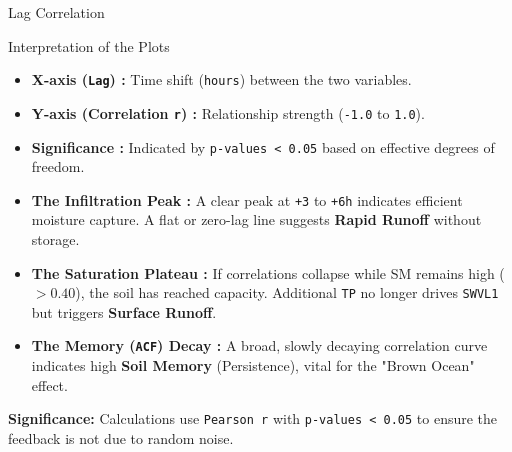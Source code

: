 \documentclass[8pt, aspectratio=169]{beamer}
\begin{document}
\begin{frame}{Lag Correlation}
    \vspace{0.2cm}
    \begin{block}{Interpretation of the Plots}
        \begin{itemize}
            \item \textbf{X-axis (\texttt{Lag}) :} Time shift (\texttt{hours}) between the two variables.
            \item \textbf{Y-axis (Correlation \texttt{r}) :} Relationship strength (\texttt{-1.0} to \texttt{1.0}).
            \item \textbf{Significance :} Indicated by \texttt{p-values < 0.05} based on effective degrees of freedom.
            \item \textbf{The Infiltration Peak :} A clear peak at \texttt{+3} to \texttt{+6h} indicates efficient moisture capture. A flat or zero-lag line suggests \textbf{Rapid Runoff} without storage.
            \item \textbf{The Saturation Plateau :} If correlations collapse while SM remains high ($>0.40$), the soil has reached capacity. Additional \texttt{TP} no longer drives \texttt{SWVL1} but triggers \textbf{Surface Runoff}.
            \item \textbf{The Memory (\texttt{ACF}) Decay :} A broad, slowly decaying correlation curve indicates high \textbf{Soil Memory} (Persistence), vital for the "Brown Ocean" effect. \cite{seneviratne2010investigating}
        \end{itemize}
    \end{block}

    \vspace{0.15cm}
    \footnotesize
    \textbf{Significance:} Calculations use \texttt{Pearson r} with \texttt{p-values < 0.05} to ensure the feedback is not due to random noise.
\end{frame}
\end{document}
